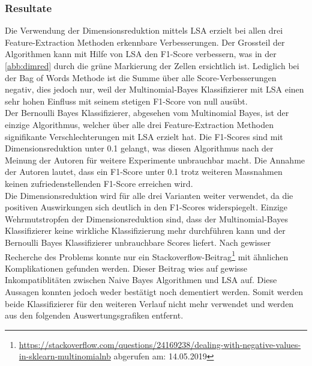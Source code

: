 \subsubsection{Resultate}
Die Verwendung der Dimensionsreduktion mittels LSA erzielt bei allen drei Feature-Extraction Methoden erkennbare Verbesserungen.
Der Grossteil der Algorithmen kann mit Hilfe von LSA den F1-Score verbessern, was in der \cref{abb:dimred} durch die grüne Markierung der Zellen ersichtlich ist.
Lediglich bei der \glqq Bag of Words\grqq{} Methode ist die Summe über alle Score-Verbesserungen negativ, dies jedoch nur, weil der Multinomial-Bayes Klassifizierer mit LSA einen sehr hohen Einfluss mit seinem stetigen F1-Score von null ausübt.\\
Der Bernoulli Bayes Klassifizierer, abgesehen vom Multinomial Bayes, ist der einzige Algorithmus, welcher über alle drei Feature-Extraction Methoden signifikante Verschlechterungen mit LSA erzielt hat. Die F1-Scores sind mit Dimensionsreduktion unter 0.1 gelangt, was diesen Algorithmus nach der Meinung der Autoren für weitere Experimente unbrauchbar macht. Die Annahme der Autoren lautet, dass ein F1-Score unter 0.1 trotz weiteren Massnahmen keinen zufriedenstellenden F1-Score erreichen wird.\\
Die Dimensionsreduktion wird für alle drei Varianten weiter verwendet, da die positiven Auswirkungen sich deutlich in den F1-Scores widerspiegelt.
Einzige Wehrmutstropfen der Dimensionsreduktion sind, dass der Multinomial-Bayes Klassifizierer keine wirkliche Klassifizierung mehr durchführen kann und der Bernoulli Bayes Klassifizierer unbrauchbare Scores liefert.
Nach gewisser Recherche des Problems konnte nur ein Stackoverflow-Beitrag\footnote{\url{https://stackoverflow.com/questions/24169238/dealing-with-negative-values-in-sklearn-multinomialnb} abgerufen am: 14.05.2019} mit ähnlichen Komplikationen gefunden werden.
Dieser Beitrag wies auf gewisse Inkompatiblitäten zwischen Naive Bayes Algorithmen und LSA auf.
Diese Aussagen konnten jedoch weder bestätigt noch dementiert werden.
Somit werden beide Klassifizierer für den weiteren Verlauf nicht mehr verwendet und werden aus den folgenden Auswertungsgrafiken entfernt.
